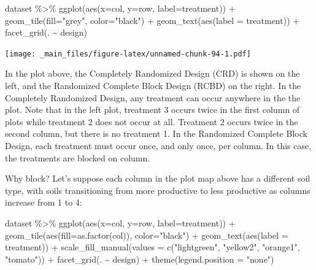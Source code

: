 \documentclass[
]{book}
\newenvironment{Shaded}{\begin{snugshade}}{\end{snugshade}}
\newcommand{\AttributeTok}[1]{\textcolor[rgb]{0.77,0.63,0.00}{#1}}
\newcommand{\FunctionTok}[1]{\textcolor[rgb]{0.00,0.00,0.00}{#1}}
\newcommand{\NormalTok}[1]{#1}
\newcommand{\SpecialCharTok}[1]{\textcolor[rgb]{0.00,0.00,0.00}{#1}}
\newcommand{\StringTok}[1]{\textcolor[rgb]{0.31,0.60,0.02}{#1}}
\begin{document}
\begin{Shaded}
\begin{Highlighting}[]
\NormalTok{dataset }\SpecialCharTok{\%\textgreater{}\%}
  \FunctionTok{ggplot}\NormalTok{(}\FunctionTok{aes}\NormalTok{(}\AttributeTok{x=}\NormalTok{col, }\AttributeTok{y=}\NormalTok{row, }\AttributeTok{label=}\NormalTok{treatment)) }\SpecialCharTok{+}
  \FunctionTok{geom\_tile}\NormalTok{(}\AttributeTok{fill=}\StringTok{"grey"}\NormalTok{, }\AttributeTok{color=}\StringTok{"black"}\NormalTok{) }\SpecialCharTok{+}
  \FunctionTok{geom\_text}\NormalTok{(}\FunctionTok{aes}\NormalTok{(}\AttributeTok{label =}\NormalTok{ treatment)) }\SpecialCharTok{+}
  \FunctionTok{facet\_grid}\NormalTok{(. }\SpecialCharTok{\textasciitilde{}}\NormalTok{ design)}
\end{Highlighting}
\end{Shaded}

\texttt{[image: \_main\_files/figure-latex/unnamed-chunk-94-1.pdf]}

In the plot above, the Completely Randomized Design (CRD) is shown on the left, and the Randomized Complete Block Design (RCBD) on the right. In the Completely Randomized Design, any treatment can occur anywhere in the the plot. Note that in the left plot, treatment 3 occurs twice in the first column of plots while treatment 2 does not occur at all. Treatment 2 occurs twice in the second column, but there is no treatment 1. In the Randomized Complete Block Design, each treatment must occur once, and only once, per column. In this case, the treatments are blocked on column.

Why block? Let's suppose each column in the plot map above has a different soil type, with soils transitioning from more productive to less productive as columns increase from 1 to 4:

\begin{Shaded}
\begin{Highlighting}[]
\NormalTok{dataset }\SpecialCharTok{\%\textgreater{}\%}
  \FunctionTok{ggplot}\NormalTok{(}\FunctionTok{aes}\NormalTok{(}\AttributeTok{x=}\NormalTok{col, }\AttributeTok{y=}\NormalTok{row, }\AttributeTok{label=}\NormalTok{treatment)) }\SpecialCharTok{+}
  \FunctionTok{geom\_tile}\NormalTok{(}\FunctionTok{aes}\NormalTok{(}\AttributeTok{fill=}\FunctionTok{as.factor}\NormalTok{(col)), }\AttributeTok{color=}\StringTok{"black"}\NormalTok{) }\SpecialCharTok{+}
  \FunctionTok{geom\_text}\NormalTok{(}\FunctionTok{aes}\NormalTok{(}\AttributeTok{label =}\NormalTok{ treatment)) }\SpecialCharTok{+}
  \FunctionTok{scale\_fill\_manual}\NormalTok{(}\AttributeTok{values =} \FunctionTok{c}\NormalTok{(}\StringTok{"lightgreen"}\NormalTok{, }\StringTok{"yellow2"}\NormalTok{, }\StringTok{"orange1"}\NormalTok{, }\StringTok{"tomato"}\NormalTok{)) }\SpecialCharTok{+} 
  \FunctionTok{facet\_grid}\NormalTok{(. }\SpecialCharTok{\textasciitilde{}}\NormalTok{ design) }\SpecialCharTok{+}
  \FunctionTok{theme}\NormalTok{(}\AttributeTok{legend.position =} \StringTok{"none"}\NormalTok{)}
\end{Highlighting}
\end{Shaded}
\end{document}
